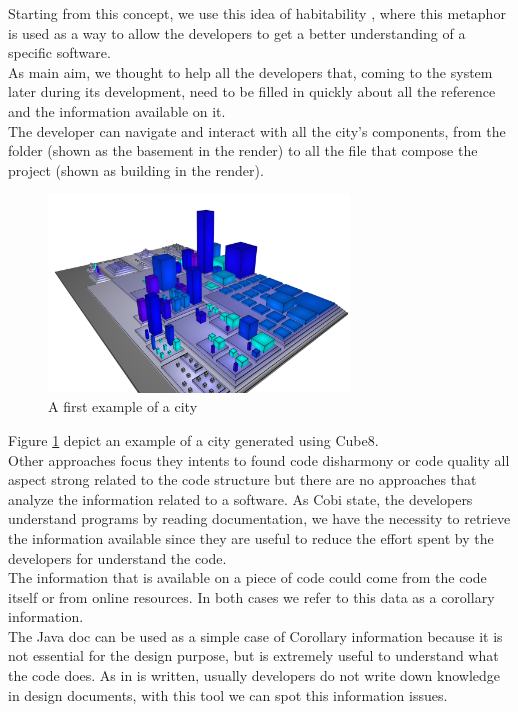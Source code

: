 \documentclass[]{usiinfbachelorproject}
\begin{document}
Starting from this concept, we use this idea of habitability \cite{vssac}, where this metaphor is used as a way to allow the developers to get a better understanding of a specific software. \\
As main aim, we thought to help all the developers that, coming to the system later during its development, need to be filled in quickly about all the reference and the information available on it.\\
The developer can navigate and interact with all the city's components, from the folder (shown as the basement in the render) to all the file that compose the project (shown as building in the render). \\
\begin{figure}[h]
	\centering
\includegraphics[width=8cm]{images/city1}

\caption{A first example of a city\label {fig:myO}}
\end{figure}
Figure \ref{fig:myO} depict an example of a city generated using Cube8.\\
Other approaches focus they intents to found code disharmony \cite{programComp} or code quality \cite{VVV} all aspect strong related to the code structure but there are no approaches that analyze the information related to a software. As Cobi \cite{Corbi} state, the developers understand programs by reading documentation, we have the necessity to retrieve the information available since they are useful to reduce the effort spent by the developers for understand the code.\\
The information that is available on a piece of code could come from the code itself or from online resources. In both cases we refer to this data as a corollary information.\\
The Java doc can be used as a simple case of Corollary information because it is not essential for the design purpose, but is extremely useful to understand what the code does. As in \cite{LaToza} is written, usually developers do not write down knowledge in design documents, with this tool we can spot this information issues.\\
\end{document}
